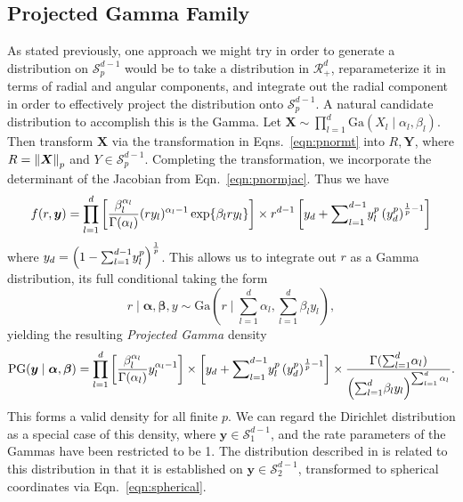 \subsection{Projected Gamma Family}
As stated previously, one approach we might try in order to generate a distribution on
  $\mathcal{S}_{p}^{d-1}$ would be to take a distribution in $\mathcal{R}_{+}^d$, reparameterize
  it in terms of radial and angular components, and integrate out the radial component in order to
  effectively project the distribution onto $\mathcal{S}_{p}^{d-1}$.  A natural candidate distribution
  to accomplish this is the Gamma.  Let $\bm{ X} \sim \prod_{l = 1}^d\text{Ga}\left(X_l\mid\alpha_l,\beta_l\right)$.
  Then transform $\bm{ X}$ via the transformation in Eqns.~\ref{eqn:pnormt} into $R,\bm{ Y}$, where
  $R = \left\lVert \bm{ X} \right\rVert_{p}$ and $Y\in \mathcal{S}_{p}^{d-1}$.  Completing the transformation, we
  incorporate the determinant of the Jacobian from Eqn.~\ref{eqn:pnormjac}.  Thus we have
  \begin{equation}
    \label{eqn:protopg}
    f(r,\bm{ y}) = \prod_{l = 1}^{d}
      \left[\frac{\beta_l^{\alpha_l}}{\Gamma(\alpha_l)}(ry_l)^{\alpha_l - 1}\exp\lbrace \beta_lry_l\rbrace\right]
      \times r^{d-1}\left[y_d + {\small \sum}_{l = 1}^{d-1}y_l^p\left(y_d^p\right)^{\frac{1}{p} - 1}\right]
  \end{equation}
  where $y_d = \left(1 - {\small \sum}_{l = 1}^{d-1}y_l^p\right)^{\frac{1}{p}}$.  This allows us to
  integrate out $r$ as a Gamma distribution, its full conditional taking the form
  \begin{equation}
    \label{eqn:rfullcond}
    r\mid\bm{ \alpha},\bm{ \beta}, y \sim \text{Ga}\left(r\mid\sum_{l = 1}^d \alpha_l, \sum_{l = 1}^d \beta_ly_l\right),
  \end{equation}
  yielding the resulting \emph{Projected Gamma} density
  \begin{equation}
    \label{eqn:projgamma}
    \text{PG}(\bm{ y}\mid\bm{ \alpha},\bm{ \beta}) = \prod_{l = 1}^d\left[\frac{\beta_l^{\alpha_l}}{\Gamma(\alpha_l)}y_l^{\alpha_l - 1}\right]
      \times \left[y_d + {\small \sum}_{l = 1}^{d-1}y_l^p\left(y_d^p\right)^{\frac{1}{p} - 1}\right]
      \times \frac{\Gamma({\small\sum}_{l = 1}^d\alpha_l)}{\left({\small\sum}_{l = 1}^d \beta_ly_l\right)^{{\small\sum_{l = 1}^d \alpha_l}}}.
  \end{equation}
  This forms a valid density for all finite $p$.  We can regard the Dirichlet distribution as a
  special case of this density, where $\bm{ y}\in \mathcal{S}_1^{d-1}$, and the rate parameters of
  the Gammas have been restricted to be 1.  The distribution described in \cite{nunez2019} is related
  to this distribution in that it is established on $\bm{ y}\in \mathcal{S}_2^{d-1}$, transformed to
  spherical coordinates via Eqn.~\ref{eqn:spherical}.

